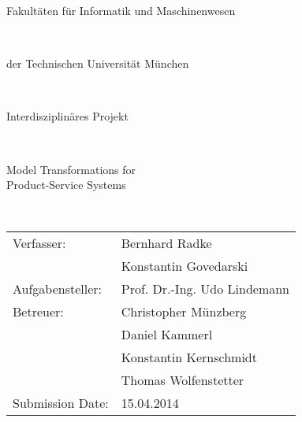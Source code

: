 \frontmatter
\pagestyle{empty}

\begin{titlepage}
\begin{center}
\begin{huge}
Fakult\"aten f\"ur Informatik und Maschinenwesen
\end{huge}\\
\vspace{4mm}
\begin{Large}
der Technischen Universit\"at M\"unchen
\end{Large}\\
\vspace{2.5cm}
\begin{Large}
Interdisziplin\"ares Projekt
\vspace{2.75cm}
\end{Large}\\
\begin{huge}
Model Transformations for\\\vspace{5mm} Product-Service Systems
\end{huge}\\
\vspace{1.25cm}
\begin{large}
\begin{tabular}{ll}
\vspace{0.1in}
Verfasser:& Bernhard Radke\\
\vspace{0.2in}
& Konstantin Govedarski\\
\vspace{0.2in}
Aufgabensteller:&Prof. Dr.-Ing. Udo Lindemann\\
\vspace{0.1in}
Betreuer: &Christopher M\"unzberg\\	
\vspace{0.1in}
&Daniel Kammerl\\
\vspace{0.1in}
&Konstantin Kernschmidt\\
\vspace{0.2in}
&Thomas Wolfenstetter\\
Submission Date:&15.04.2014\end{tabular}
\end{large}
\end{center}


\end{titlepage}
